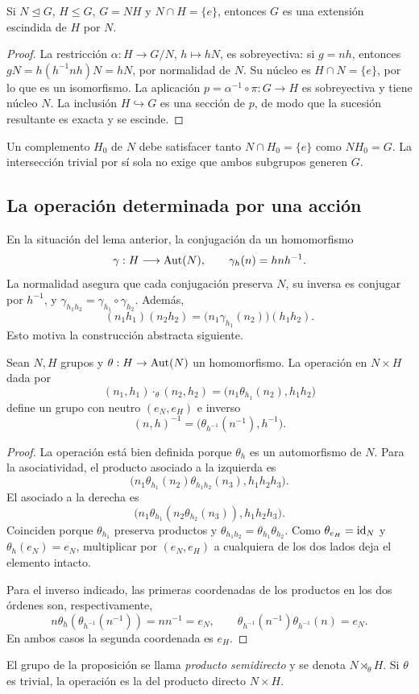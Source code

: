 \begin{lema}\label{lema:C10-escision}
Si $N\trianglelefteq G$, $H\le G$, $G=NH$ y $N\cap H=\{e\}$, entonces $G$ es una extensión escindida de $H$ por $N$.
\end{lema}
\begin{proof}
La restricción $\alpha:H\to G/N$, $h\mapsto hN$, es sobreyectiva: si $g=nh$, entonces $gN=h(h^{-1}nh)N=hN$, por normalidad de $N$. Su núcleo es $H\cap N=\{e\}$, por lo que es un isomorfismo. La aplicación $p=\alpha^{-1}\circ\pi:G\to H$ es sobreyectiva y tiene núcleo $N$. La inclusión $H\hookrightarrow G$ es una sección de $p$, de modo que la sucesión resultante es exacta y se escinde.
\end{proof}
\begin{obs}
Un complemento $H_0$ de $N$ debe satisfacer tanto $N\cap H_0=\{e\}$ como $NH_0=G$. La intersección trivial por sí sola no exige que ambos subgrupos generen $G$.
\end{obs}

\subsection{La operación determinada por una acción}\label{tema:10-2-1}
En la situación del lema anterior, la conjugación da un homomorfismo
\[
\gamma:H\longrightarrow\operatorname{Aut}(N),\qquad \gamma_h(n)=hnh^{-1}.
\]
La normalidad asegura que cada conjugación preserva $N$, su inversa es conjugar por $h^{-1}$, y $\gamma_{h_1h_2}=\gamma_{h_1}\circ\gamma_{h_2}$. Además,
\[
(n_1h_1)(n_2h_2)=\bigl(n_1\gamma_{h_1}(n_2)\bigr)(h_1h_2).
\]
Esto motiva la construcción abstracta siguiente.

\begin{prop}\label{prop:C10-construccion}
Sean $N,H$ grupos y $\theta:H\to\operatorname{Aut}(N)$ un homomorfismo. La operación en $N\times H$ dada por
\[
(n_1,h_1)\cdot_\theta(n_2,h_2)
=\bigl(n_1\theta_{h_1}(n_2),h_1h_2\bigr)
\]
define un grupo con neutro $(e_N,e_H)$ e inverso
\[
(n,h)^{-1}=\bigl(\theta_{h^{-1}}(n^{-1}),h^{-1}\bigr).
\]
\end{prop}
\begin{proof}
La operación está bien definida porque $\theta_h$ es un automorfismo de $N$. Para la asociatividad, el producto asociado a la izquierda es
\[
\bigl(n_1\theta_{h_1}(n_2)\theta_{h_1h_2}(n_3),h_1h_2h_3\bigr).
\]
El asociado a la derecha es
\[
\bigl(n_1\theta_{h_1}(n_2\theta_{h_2}(n_3)),h_1h_2h_3\bigr).
\]
Coinciden porque $\theta_{h_1}$ preserva productos y $\theta_{h_1h_2}=\theta_{h_1}\theta_{h_2}$. Como $\theta_{e_H}=\operatorname{id}_N$ y $\theta_h(e_N)=e_N$, multiplicar por $(e_N,e_H)$ a cualquiera de los dos lados deja el elemento intacto.

Para el inverso indicado, las primeras coordenadas de los productos en los dos órdenes son, respectivamente,
\[
n\theta_h(\theta_{h^{-1}}(n^{-1}))=nn^{-1}=e_N,
\qquad
\theta_{h^{-1}}(n^{-1})\theta_{h^{-1}}(n)=e_N.
\]
En ambos casos la segunda coordenada es $e_H$.
\end{proof}
\begin{defi}
El grupo de la proposición se llama \emph{producto semidirecto} y se denota $N\rtimes_\theta H$. Si $\theta$ es trivial, la operación es la del producto directo $N\times H$.
\end{defi}

